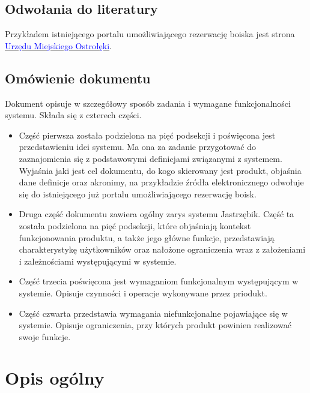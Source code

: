 \documentclass[a4paper,11pt]{article}
\begin{document}
\subsection {Odwołania do literatury}
Przykładem istniejącego portalu umożliwiającego rezerwację boiska jest strona  \href{https://www.ostroleka.pl/boiska/}{\textcolor{blue}{Urzędu Miejskiego Ostrołęki}}.

\subsection {Omówienie dokumentu}
Dokument opisuje w szczegółowy sposób zadania i wymagane funkcjonalności systemu. Składa się z czterech części.
\begin{itemize}
	\item Część pierwsza  została podzielona na pięć podsekcji i poświęcona jest przedstawieniu idei systemu. Ma ona za zadanie przygotować do zaznajomienia się z podstawowymi definicjami związanymi z systemem. Wyjaśnia jaki jest cel dokumentu, do kogo skierowany jest produkt, objaśnia dane definicje oraz akronimy, na przykładzie źródła elektronicznego odwołuje się do istniejącego już portalu umożliwiającego rezerwację boisk. 
	\item Druga część dokumentu zawiera ogólny zarys systemu Jastrzębik. Część ta została podzielona na pięć podsekcji, które objaśniają kontekst funkcjonowania produktu, a także jego główne funkcje, przedstawiają charakterystykę użytkowników oraz nałożone ograniczenia wraz z założeniami i zależnościami występującymi w systemie.
	\item Część trzecia poświęcona jest wymaganiom funkcjonalnym występującym w systemie. Opisuje czynności i operacje wykonywane przez priodukt.
	\item Część czwarta przedstawia wymagania niefunkcjonalne pojawiające się w systemie. Opisuje ograniczenia, przy których produkt powinien realizować swoje funkcje.
\end{itemize}

\section {Opis ogólny}
\end{document}
